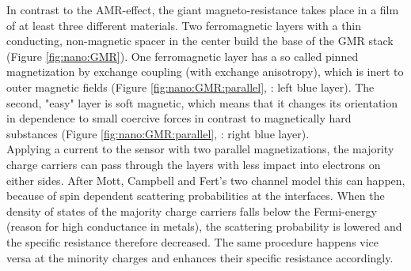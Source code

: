 In contrast to the AMR-effect, the giant magneto-resistance takes place in a film of at least three different materials.\cite{patent:GMR} Two ferromagnetic layers with a thin conducting, non-magnetic spacer in the center build the base of the GMR stack (Figure \ref{fig:nano:GMR}). One ferromagnetic layer has a so called pinned magnetization by exchange coupling (with exchange anisotropy), which is inert to outer magnetic fields (Figure \ref{fig:nano:GMR:parallel}, \protect{}: left blue layer). The second, "easy" layer is soft magnetic, which means that it changes its orientation in dependence to small coercive forces in contrast to magnetically hard substances (Figure \ref{fig:nano:GMR:parallel}, \protect{}: right blue layer). \\
Applying a current to the sensor with two parallel magnetizations, the majority charge carriers can pass through the layers with less impact into electrons on either sides. After Mott, Campbell and Fert's two channel model this can happen, because of spin dependent scattering probabilities at the interfaces. When the density of states of the majority charge carriers falls below the Fermi-energy (reason for high conductance in metals), the scattering probability is lowered and the specific resistance therefore decreased. The same procedure happens vice versa at the minority charges and enhances their specific resistance accordingly.\cite{lit:nano:austauschanistropie}\cite{lit:nano:spinelectronics}


